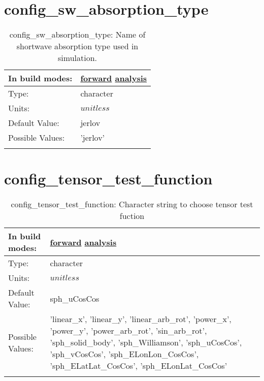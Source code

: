\section[config\_sw\_absorption\_type]{config\_sw\_absorption\_type}
\label{sec:nm_sec_config_sw_absorption_type}
\begin{center}
\begin{longtable}{| p{2.0in} || p{4.0in} |}
    \hline
    In build modes: & \hyperref[subsec:forward_nm_tab_forcing]{forward} \hyperref[subsec:analysis_nm_tab_forcing]{analysis} \\
    \hline
    Type: & character \\
    \hline
    Units: & $unitless$ \\
    \hline
    Default Value: & jerlov \\
    \hline
    Possible Values: & 'jerlov' \\
    \hline
    \caption{config\_sw\_absorption\_type: Name of shortwave absorption type used in simulation.}
\end{longtable}
\end{center}
\section[config\_tensor\_test\_function]{config\_tensor\_test\_function}
\label{sec:nm_sec_config_tensor_test_function}
\begin{center}
\begin{longtable}{| p{2.0in} || p{4.0in} |}
    \hline
    In build modes: & \hyperref[subsec:forward_nm_tab_testing]{forward} \hyperref[subsec:analysis_nm_tab_testing]{analysis} \\
    \hline
    Type: & character \\
    \hline
    Units: & $unitless$ \\
    \hline
    Default Value: & sph\_uCosCos \\
    \hline
    Possible Values: & 'linear\_x', 'linear\_y', 'linear\_arb\_rot', 'power\_x', 'power\_y', 'power\_arb\_rot', 'sin\_arb\_rot', 'sph\_solid\_body', 'sph\_Williamson', 'sph\_uCosCos', 'sph\_vCosCos', 'sph\_ELonLon\_CosCos', 'sph\_ELatLat\_CosCos', 'sph\_ELonLat\_CosCos' \\
    \hline
    \caption{config\_tensor\_test\_function: Character string to choose tensor test fuction}
\end{longtable}
\end{center}
